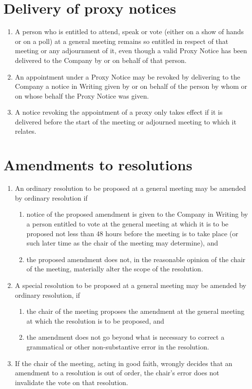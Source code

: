\documentclass[a4paper,12pt]{article}
\begin{document}
\section{Delivery of proxy notices}

\begin{enumerate}
  \item A person who is entitled to attend, speak or vote (either on a show of hands or on a poll) at a general meeting remains so entitled in respect of that meeting or any adjournment of it, even though a valid Proxy Notice has been delivered to the Company by or on behalf of that person.
  \item An appointment under a Proxy Notice may be revoked by delivering to the Company a notice in Writing given by or on behalf of the person by whom or on whose behalf the Proxy Notice was given.
  \item A notice revoking the appointment of a proxy only takes effect if it is delivered before the start of the meeting or adjourned meeting to which it relates.
\end{enumerate}

\section{Amendments to resolutions}

\begin{enumerate}
  \item An ordinary resolution to be proposed at a general meeting may be amended by ordinary resolution if
  \begin{enumerate}
    \item notice of the proposed amendment is given to the Company in Writing by a person entitled to vote at the general meeting at which it is to be proposed not less than 48 hours before the meeting is to take place (or such later time as the chair of the meeting may determine), and
    \item the proposed amendment does not, in the reasonable opinion of the chair of the meeting, materially alter the scope of the resolution.
  \end{enumerate}
  \item A special resolution to be proposed at a general meeting may be amended by ordinary resolution, if
  \begin{enumerate}
    \item the chair of the meeting proposes the amendment at the general meeting at which the resolution is to be proposed, and
    \item the amendment does not go beyond what is necessary to correct a grammatical or other non-substantive error in the resolution.
  \end{enumerate}
  \item If the chair of the meeting, acting in good faith, wrongly decides that an amendment to a resolution is out of order, the chair's error does not invalidate the vote on that resolution.
\end{enumerate}
\end{document}
